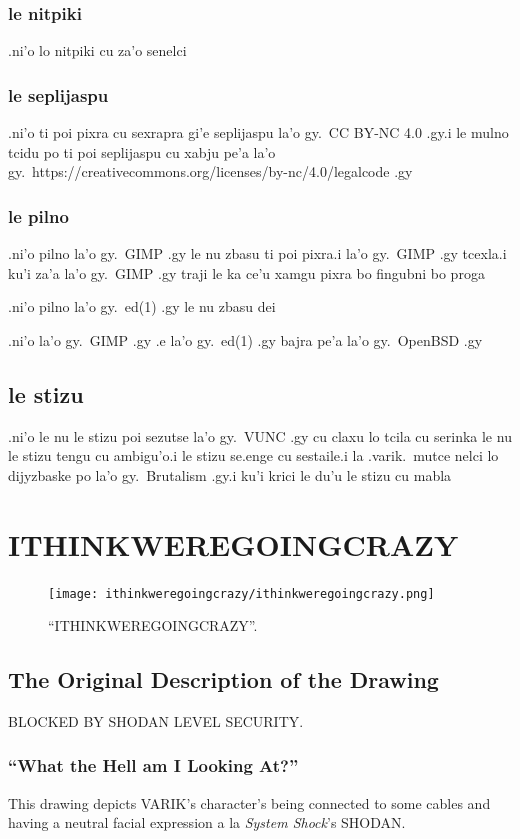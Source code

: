 \documentclass{report}
\begin{document}
\subsection{le nitpiki}
.ni'o lo nitpiki cu za'o senelci
\subsection{le seplijaspu}
.ni'o ti poi pixra cu sexrapra gi'e seplijaspu la'o gy.\ CC BY-NC 4.0 .gy\@ .i le mulno tcidu po ti poi seplijaspu cu xabju pe'a la'o gy.\ https://creativecommons.org/licenses/by-nc/4.0/legalcode .gy
\subsection{le pilno}
.ni'o pilno la'o gy.\ GIMP .gy le nu zbasu ti poi pixra\@  .i la'o gy.\ GIMP .gy tcexla\@  .i ku'i za'a la'o gy.\ GIMP .gy traji le ka ce'u xamgu pixra bo fingubni bo proga

.ni'o pilno la'o gy.\ ed(1) .gy le nu zbasu dei

.ni'o la'o gy.\ GIMP .gy .e la'o gy.\ ed(1) .gy bajra pe'a la'o gy.\ OpenBSD .gy
\section{le stizu}
.ni'o le nu le stizu poi sezutse la'o gy.\ VUNC .gy cu claxu lo tcila cu serinka le nu le stizu tengu cu ambigu'o\@  .i le stizu se.enge cu sestaile\@  .i la .varik.\ mutce nelci lo dijyzbaske po la'o gy.\ Brutalism .gy\@  .i ku'i krici le du'u le stizu cu mabla
\chapter{ITHINKWEREGOINGCRAZY}
\begin{figure}[ht]
	\centering
	\texttt{[image: ithinkweregoingcrazy/ithinkweregoingcrazy.png]}
	\caption[center]{``ITHINKWEREGOINGCRAZY''.}
\end{figure}
\section{The Original Description of the Drawing}
BLOCKED BY SHODAN LEVEL SECURITY\@.
\subsection{``What the Hell am I Looking At?''}
This drawing depicts VARIK's character's being connected to some cables and having a neutral facial expression a la \textit{System Shock}'s SHODAN\@.
\end{document}
